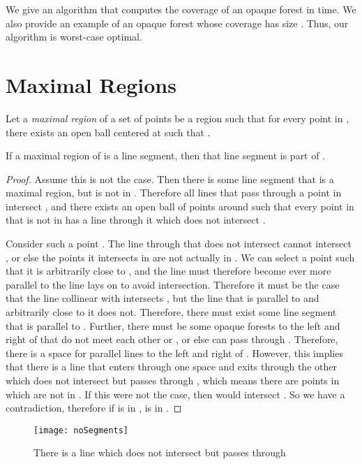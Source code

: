 \documentclass{cccg12}
\begin{document}
We give an algorithm that computes the coverage of an opaque forest in
 time. We also provide an example of an opaque forest whose
coverage has size . Thus, our algorithm is worst-case
optimal.

\section{Maximal Regions}

 Let a \emph{maximal region} of a set  of points be a region
    such that for every point  in , there exists an open
   ball  centered at  such that .

\begin{lemma}
\label{lemma:hasNoLines}
If a maximal region of  is a line segment, then that line segment is part of .
\end{lemma}

\begin{proof}
Assume this is not the case. Then there is some line segment  that is a maximal region, but is not in . Therefore all lines that pass through a point  in  intersect , and there exists an open ball  of points around  such that every point  in  that is not in  has a line  through it which does not intersect .

Consider such a point . The line  through  that does not intersect  cannot intersect , or else the points it intersects in  are not actually in . We can select a point  such that it is arbitrarily close to , and the line  must therefore become ever more parallel to the line  lays on to avoid intersection. Therefore it must be the case that the line collinear with  intersects , but the line  that is parallel to  and arbitrarily close to it does not. Therefore, there must exist some line segment  that is parallel to . Further, there must be some opaque forests to the left and right of  that do not meet each other or , or else  can pass through . Therefore, there is a space for parallel lines to the left and right of . However, this implies that there is a line  that enters through one space and exits through the other which does not intersect  but passes through , which means there are points in  which are not in . If this were not the case, then  would intersect . So we have a contradiction, therefore if  is in ,  is in .\end{proof}

\begin{figure}[ht]
  \centering
  \texttt{[image: noSegments]}
  \caption{There is a line  which does not intersect  but passes through }
  \label{fig:noSegments}
\end{figure}
\end{document}
